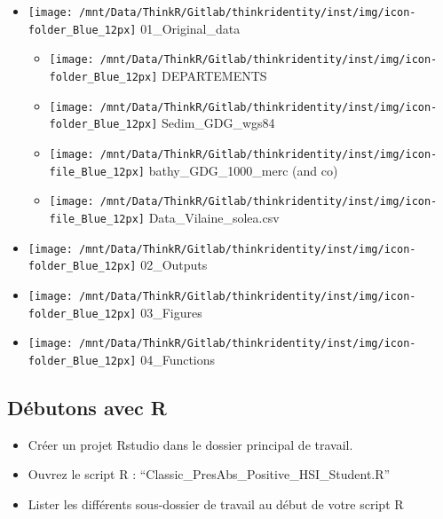 \documentclass[french,a4paper]{article}
\providecommand{\tightlist}{%
  \setlength{\itemsep}{0pt}\setlength{\parskip}{0pt}}
\begin{document}
\begin{itemize}
\tightlist
\item
  \texttt{[image: /mnt/Data/ThinkR/Gitlab/thinkridentity/inst/img/icon-folder\_Blue\_12px]} 01\_Original\_data

  \begin{itemize}
  \tightlist
  \item
    \texttt{[image: /mnt/Data/ThinkR/Gitlab/thinkridentity/inst/img/icon-folder\_Blue\_12px]} DEPARTEMENTS
  \item
    \texttt{[image: /mnt/Data/ThinkR/Gitlab/thinkridentity/inst/img/icon-folder\_Blue\_12px]} Sedim\_GDG\_wgs84
  \item
    \texttt{[image: /mnt/Data/ThinkR/Gitlab/thinkridentity/inst/img/icon-file\_Blue\_12px]} bathy\_GDG\_1000\_merc (and co)
  \item
    \texttt{[image: /mnt/Data/ThinkR/Gitlab/thinkridentity/inst/img/icon-file\_Blue\_12px]} Data\_Vilaine\_solea.csv
  \end{itemize}
\item
  \texttt{[image: /mnt/Data/ThinkR/Gitlab/thinkridentity/inst/img/icon-folder\_Blue\_12px]} 02\_Outputs
\item
  \texttt{[image: /mnt/Data/ThinkR/Gitlab/thinkridentity/inst/img/icon-folder\_Blue\_12px]} 03\_Figures
\item
  \texttt{[image: /mnt/Data/ThinkR/Gitlab/thinkridentity/inst/img/icon-folder\_Blue\_12px]} 04\_Functions
\end{itemize}

\hypertarget{debutons-avec-r}{%
\subsection{Débutons avec R}\label{debutons-avec-r}}

\begin{itemize}
\tightlist
\item
  Créer un projet Rstudio dans le dossier principal de travail.
\item
  Ouvrez le script R : ``Classic\_PresAbs\_Positive\_HSI\_Student.R''
\item
  Lister les différents sous-dossier de travail au début de votre script R
\end{itemize}
\end{document}
